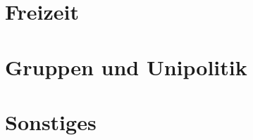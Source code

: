 \documentclass[]{papertex}
\begin{document}
	\section{Freizeit}
		\label{freizeit}
		
	\newpage
	\section{Gruppen und Unipolitik}
		\label{politik}
		
		
	\newpage
	\section{Sonstiges}
		\label{sonstiges}
		
		
		
		
\end{document}
